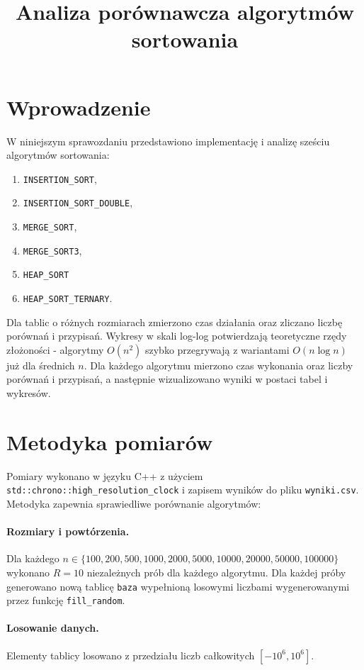 \documentclass{article}
\title{Analiza porównawcza algorytmów sortowania}
\begin{document}
	\maketitle
	
	\section{Wprowadzenie}
	W niniejszym sprawozdaniu przedstawiono implementację i analizę sześciu algorytmów sortowania:
	
	\begin{enumerate}
		\item \texttt{INSERTION\_SORT},
		\item \texttt{INSERTION\_SORT\_DOUBLE},
		\item \texttt{MERGE\_SORT},
		\item \texttt{MERGE\_SORT3},
		\item \texttt{HEAP\_SORT} 
		\item \texttt{HEAP\_SORT\_TERNARY}.
	\end{enumerate}
	
	
	
	Dla tablic o różnych rozmiarach zmierzono czas działania oraz zliczano liczbę porównań i przypisań.
	Wykresy w skali log-log potwierdzają teoretyczne rzędy złożoności - algorytmy $O(n^2)$ szybko przegrywają z wariantami $O(n\log n)$ już dla średnich $n$.	 
	Dla każdego algorytmu mierzono czas wykonania oraz liczby porównań i przypisań, a następnie wizualizowano wyniki w postaci tabel i wykresów.
	
	\section{Metodyka pomiarów}
	Pomiary wykonano w języku C++ z użyciem \texttt{std::chrono::high\_resolution\_clock} i zapisem wyników do pliku \texttt{wyniki.csv}. Metodyka zapewnia sprawiedliwe porównanie algorytmów:
	
	\paragraph{Rozmiary i powtórzenia.}
	Dla każdego $n \in \{100, 200, 500, 1000, 2000, 5000, 10000, 20000, 50000, 100000\}$ wykonano $R=10$ niezależnych prób dla każdego algorytmu. Dla każdej próby generowano nową tablicę \texttt{baza} wypełnioną losowymi liczbami wygenerowanymi przez funkcję \texttt{fill\_random}.
	
	\paragraph{Losowanie danych.}
	Elementy tablicy losowano z przedziału liczb całkowitych $[-10^6,10^6]$.
	
\end{document}
